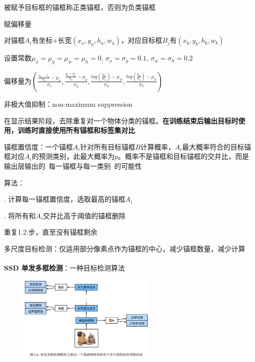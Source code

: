 \documentclass[UTF8]{ctexart}
\begin{document}
  \quad \quad 被赋予目标框的锚框称正类锚框，否则为负类锚框

  \quad 赋偏移量

  \quad \quad 对锚框$A_i$有坐标+长宽$(x_a, y_a, h_a, w_a)$，对应目标框$B_j$有$(x_b, y_b, h_b, w_b)$

  \quad \quad 设置常数$\mu_x = \mu_y = \mu_w = \mu_h = 0$, $\sigma_x = \sigma_y = 0.1$, $\sigma_w = \sigma_h = 0.2$

  \quad \quad 偏移量为$(\frac{\frac{x_b - x_a}{w_a} - \mu_x}{\sigma_x},\frac{\frac{y_b - y_a}{h_a} - \mu_y}{\sigma_y}, \frac{log(\frac{w_b}{w_a}) - \mu_w}{\sigma_w}, \frac{log(\frac{h_b}{h_a}) - \mu_h}{\sigma_h})$

  非极大值抑制：non-maximum suppression

  \quad 在显示结果阶段，去除重复对一个物体分类的锚框。\textbf{在训练结束后输出目标时使用，训练时直接使用所有锚框和标签集对比}

  \quad 锚框置信度：一个锚框$A_i$针对所有目标锚框$B$计算概率，$A_i$最大概率符合的目标锚框对应$A_i$的预测类别，此最大概率为$p$。概率不是锚框和目标锚框的交并比，而是输出层输出的\ 每一锚框与每一类别\ 的可能性

  \quad 算法：

  \quad {}. 计算每一锚框置信度，选取最高的锚框$A_i$

  \quad {}. 将所有和$A_i$交并比高于阈值的锚框删除

  \quad \quad 重复1.2.步，直至没有锚框剩余

  多尺度目标检测：仅适用部分像素点作为锚框的中心，减少锚框数量，减少计算\\\\
\textbf{SSD 单发多框检测}：一种目标检测算法

  \begin{figure}[H] %
    \centering %
    \includegraphics[width=0.6\textwidth]{note_images/SSD_archi.png} %
  \end{figure}
\end{document}
